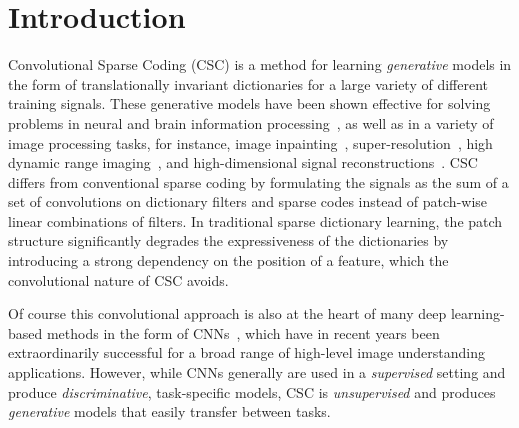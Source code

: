 \section{Introduction}
Convolutional Sparse Coding (CSC) is a method for learning {\em
  generative} models in the form of translationally invariant
dictionaries for a large variety of different training signals.  These
generative models have been shown effective for solving problems in
neural and brain information
processing~\cite{jas2017learning,peter2017sparse}, as well as in a
variety of image processing tasks, for instance, image
inpainting~\cite{heide2015fast},
super-resolution~\cite{gu2015convolutional}, high dynamic range
imaging~\cite{serrano2016convolutional}, and high-dimensional signal
reconstructions~\cite{choudhury2017consensus,bibi2017high}. CSC
differs from conventional sparse coding by formulating the signals as
the sum of a set of convolutions on dictionary filters and sparse
codes instead of patch-wise linear combinations of
filters. In traditional sparse dictionary learning, the patch
structure significantly degrades the expressiveness of the
dictionaries by introducing a strong dependency on the position of a
feature, which the convolutional nature of CSC avoids.

Of course this convolutional approach is also at the heart of many deep
learning-based methods in the form of
CNNs~\cite{lecun1998gradient,kavukcuoglu2010learning,krizhevsky2012imagenet},
which have in recent years been extraordinarily successful for a broad
range of high-level image understanding applications. However, while
CNNs generally are used in a {\em supervised} setting and produce {\em
  discriminative}, task-specific models, CSC is {\em unsupervised} and
produces {\em generative} models that easily transfer between tasks.

